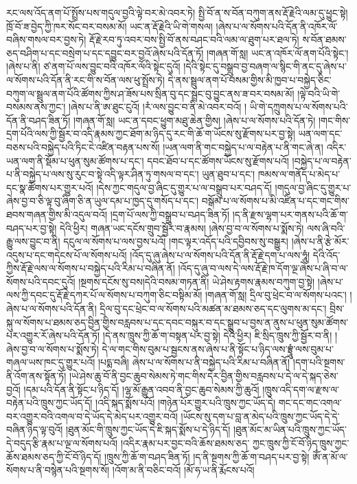 རང་ལས་འོད་ནག་པོ་སྤྲོས་པས་གདུལ་བྱའི་ལྟེ་བར་མེ་འབར་ཏེ། སྤྱི་བོ་ན་ས་བོན་བཀུག་ནས་རྡོ་རྗེའི་ལམ་དུ་ཕྱུང་སྟེ། ཁྲོ་བོ་ཟ་བྱེད་ཀྱི་ཁར་སོང་བར་བསམ་མོ། ཡང་ན་རྡོ་རྗེའི་ཡི་གེ་གསལ། །ཞེས་པ་ལ་སོགས་པའི་དོན་ནི་འཁོར་ལོ་བཞིས་གསལ་བར་བྱས་ཏེ། རྡོ་རྗེ་རབ་ཏུ་འབར་བས་སྤྱི་བོ་ནས་བཤང་བའི་ལམ་ལ་ཐུག་པར་ཐལ་ཏེ། ས་བོན་ཐམས་ཅད་བཤིག་པ་དང་བསྲེག་པ་དང་དབྱུང་བར་བྱའོ་ཞེས་པའི་དོན་ཏོ། །གཞན་གོ་སླ། ཡང་ན་འཁོར་ལོ་ནག་པོའི་སྟེང་། །ཞེས་པ་ནི། ཙ་ནག་པོ་ལས་བྱུང་བའི་འཁོར་ལོའི་སྟེང་དུའོ། །དེའི་སྟེང་དུ་བསྒྲུབ་བྱ་བཞག་ལ་སྙིང་གི་ནང་དུ་ཞེས་པ་ལ་སོགས་པའི་དོན་ནི་རང་གི་ས་བོན་ལས་ཕུ་སྤྲོས་ཏེ། དེ་ནས་སྦྲུལ་ནག་པོ་བསམ་གྱིས་མི་ཁྱབ་པ་བསྐྱེད་ཅིང་བཀུག་ལ་སྦྲུལ་ནག་པོའི་ཚོགས་ཀྱིས་ཤ་ཟོས་པས་སྲིན་བུ་དང་སྦྲང་བུ་བྱུང་ནས་ཟ་བར་བསམ་མོ། །ལྟེ་བའི་ཡི་གེ་བསམས་ནས་ཀྱང་། །ཞེས་པ་ནི་ཨ་ཐུང་ངུའོ། །རཾ་ལས་བྱུང་བ་ནི་མེ་འབར་བའོ། །
ཡི་གེ་དཀྲུགས་པ་ལ་སོགས་པའི་དོན་ནི་བཤད་ཟིན་ཏོ། །གཞན་གོ་སླ། ཡང་ན་དབང་ཕྱུག་མཐུ་ཆེན་གྱིས། །ཞེས་པ་ལ་སོགས་པའི་དོན་ཏེ། །གང་གིས་དྲག་པོའི་ལས་ཀྱི་སྦྱོར་བ་འདི་རྣམས་ཀྱང་ཐོག་མ་ཉིད་དུ་རང་གི་ཆོ་ག་ཡོངས་སུ་རྫོགས་པར་བྱ་སྟེ། ཡན་ལག་དང་བཅས་པའི་བསྐྱེད་པའི་ཏིང་ངེ་འཛིན་བརྟན་པས་སོ། །ཡན་ལག་ནི་གང་བསྐྱེད་པ་ལ་བརྟེན་པ་ནི་གང་ཞེ་ན། འདིར་ཡན་ལག་ནི་སྡོམ་པ་ཕུན་སུམ་ཚོགས་པ་དང་། དབང་ཐོབ་པ་དང་ཚོགས་ཡོངས་སུ་རྫོགས་པའོ། །བསྐྱེད་པ་ལ་བརྟེན་པ་ནི་བསྐྱེད་པ་ལས་སུ་རུང་བ་སྟེ་འདི་ལྟར་ཤིན་ཏུ་གསལ་བ་དང་། ཡུན་ཐུབ་པ་དང་། ཁམས་ལ་གནོད་པ་མེད་པ་དང་སྣ་ཚོགས་པར་གྱུར་པའོ། །དེས་ཀྱང་གདུལ་བྱ་ཞིང་དུ་གྱུར་པ་ལ་བསྒྲུབ་པར་བཤད་དོ། །གདུལ་བྱ་ཞིང་དུ་གྱུར་པ་ཞེས་བྱ་བ་ཅི་ལྟ་བུ་ཞིག་ཅི་ན་ཡུལ་དམ་པ་ཁྱད་དུ་གསོད་པ་དང་། བསྒོམ་པ་ལ་སོགས་པ་མི་འཛིན་པ་དང་གང་གིས་ཐབས་གཞན་གྱིས་མི་འདུལ་བའོ། །དྲག་པོ་ལས་ཀྱི་བསྒྲུབ་པ་​ བཤད་ཟིན་ཏོ། །ད་ནི་རྫས་ལྷག་པར་གནས་པའི་ཆོ་ག་བཤད་པར་བྱ་སྟེ། དེའི་ཕྱིར། གཞན་ཡང་དངོས་གྲུབ་སྦྱོར་བ་རྣམས། །ཞེས་བྱ་བ་ལ་སོགས་པ་སྨོས་ཏེ། ལས་ཞི་བའི་རྒྱུ་ལས་བྱུང་བ་ནི། དངུལ་ལ་སོགས་པ་ལས་བྱས་པའོ། །གང་ལྟར་འདོད་པའི་དབྱིབས་སུ་བསྒྱུར། །ཞེས་པ་ནི་རྩེ་མོར་འདུས་པ་དང་གདེངས་པོ་ལ་སོགས་པའོ། །འོད་དུ་ཞུ་ཞེས་པ་ལ་སོགས་པའི་དོན་ནི་རྡོ་རྗེ་དག་པ་ལས་ཧཱུཾ། དེའི་འོད་ཀྱིས་རྡོ་རྗེ་ལས་ལ་སོགས་པ་བསྐྱེད་པའི་རིམ་པ་བཞིན་ནོ། །འོད་དུ་ཞུ་བ་ལས་དེ་ལས་རྡོ་རྗེ་ཁ་དོག་ལྔ་ཞེས་པ་ཞི་བ་ལ་སོགས་པའི་དབང་དུའོ། །སྔགས་དངོས་སུ་བས།དེའི་བསམ་གཏན་ནི། ཡེ་ཤེས་རྟགས་རྣམས་བཀུག་བྱ་སྟེ། །ཞེས་པ་ལས་ཀྱི་དབང་དུ་རྡོ་རྗེ་དཀར་པོ་ལ་སོགས་པ་བཀུག་ཅིང་བསྟིམ་མོ། །གཞན་གོ་སླ། དྲིལ་བུ་ཕྲེང་བ་ལ་སོགས་པའང་། །ཞེས་པ་ལ་སོགས་པའི་དོན་ནི། དྲིལ་བུ་དང་ཕྲེང་བ་ལ་སོགས་པའི་མཚན་མ་ཐམས་ཅད་དང་ལུགས་མ་དང་། བྲིས་སྐུ་ལ་སོགས་པ་ཐམས་ཅད་བྱིན་གྱིས་བརླབས་པ་དང་དབང་བསྐུར་བ་དང་སྒྲུབ་པ་བྱས་ན་ནུས་པ་ཕུན་སུམ་ཚོགས་པར་འགྱུར་རོ་ཞེས་པའི་དོན་ཏོ། །དེ་ནས་ཁྲུས་ཀྱི་ཆོ་ག་བསྟན་པར་བྱ་སྟེ། དེའི་ཕྱིར། ཇི་སྲིད་ཁྲུས་ཀྱི་སྦྱོར་བ་ནི། །ཞེས་བྱ་བ་ལ་སོགས་པ་སྨོས་ཏེ། དེ་ལ་གང་གིས་བུམ་པ་སྦྱངས་ནས་ཞེས་པ་ནི་སྟོང་པ་ཉིད་ལས་བྷྲཱུཾ་ལས་བུམ་པ་གཞལ་ཡས་ཁང་དུ་གྱུར་པའོ། །པདྨ་བཞི། ཞེས་པ་ལ་སོགས་པ་ནི་བསྐྱེད་པའི་རིམ་པ་བཞིན་ནོ། །དག་པའི་སྔགས་ནི་འོག་ནས་སྟོན་ཏོ། །ཡེ་ཤེས་ཆུ་བོ་ནི་བྱང་ཆུབ་སེམས་ཏེ་གང་གིས་དེར་བྱིན་གྱིས་བརླབས་པ་དེ་ལ་དེ་སྐད་ཅེས་བྱའོ། །དམ་པའི་དོན་ནི་སྟོང་པ་ཉིད་དོ། །ལྷ་མོ་རྒྱུན་འབབ་ནི་བྱང་ཆུབ་སེམས་ཀྱི་ཆུའོ། །ཁྲུས་འདི་དག་ལ་རྫས་ལ་བརྟེན་པའི་ཁྲུས་ཀྱང་ཡོད་དོ། །འདི་སྐད་སྨོས་པའོ། །གཉེན་པོར་གྱུར་པའི་ཁྲུས་ཀྱང་ཡོད་དེ། གང་དང་གང་འགལ་བར་འགྱུར་བའི་འགལ་བ་དེ་ཡོད་དེ་མེད་པར་འགྱུར་བའོ། །ཡོངས་སུ་དག་པ་བླ་ན་མེད་པའི་ཁྲུས་ཀྱང་ཡོད་དེ་དེ་བཞིན་ཉིད་ལྟ་བུའོ། །ཐུན་མོང་གི་ཁྲུས་ཀྱང་ཡོད་དེ་ཇི་སྐད་སྨོས་པ་དེ་ཉིད་དོ། །ཐུན་མོང་མ་ཡིན་པའི་ཁྲུས་ཀྱང་ཡོད་དེ་བདུད་རྩི་རྣམ་པ་ལྔ་ལ་སོགས་པའོ། །འདིར་རྣམ་པར་བྱང་བའི་ཆོས་ཐམས་ཅད་​ ཀྱང་ཁྲུས་ཀྱི་ངོ་བོ་ཉིད་ཁྲུས་ཀྱང་ཆོས་ཐམས་ཅད་ཀྱི་ངོ་བོ་ཉིད་དོ། །ཁྲུས་ཀྱི་ཆོ་ག་བཤད་ཟིན་ཏོ། །ད་ནི་སྔགས་ཀྱི་ཆོ་ག་བཤད་པར་བྱ་སྟེ། ཨོཾ་ན་མོ་ལ་སོགས་པ་ནི་བསྙེན་པའི་སྔགས་སོ། །འོག་མ་ནི་བཅིང་བའོ། །མོ་ཧ་ཡ་ནི་རྨོངས་པའོ། 